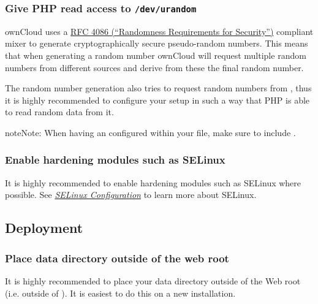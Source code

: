 \documentclass[letterpaper,10pt,english]{sphinxmanual}
\begin{document}
\subsubsection{Give PHP read access to \texttt{/dev/urandom}}
\label{configuration_server/harden_server:dev-urandom-label}\label{configuration_server/harden_server:give-php-read-access-to-dev-urandom}
ownCloud uses a \href{https://tools.ietf.org/html/rfc4086\#section-5.2}{RFC 4086 (``Randomness Requirements for Security'')} compliant
mixer to generate cryptographically secure pseudo-random numbers. This means
that when generating a random number ownCloud will request multiple random
numbers from different sources and derive from these the final random number.

The random number generation also tries to request random numbers from
, thus it is highly recommended to configure your setup in such
a way that PHP is able to read random data from it.

\begin{notice}{note}{Note:}
When having an  configured within your  file,
make sure to include .
\end{notice}


\subsubsection{Enable hardening modules such as SELinux}
\label{configuration_server/harden_server:enable-hardening-modules-such-as-selinux}
It is highly recommended to enable hardening modules such as SELinux where
possible. See {\hyperref[installation/selinux_configuration::doc]{\emph{\emph{SELinux Configuration}}}} to learn more about
SELinux.


\subsection{Deployment}
\label{configuration_server/harden_server:deployment}

\subsubsection{Place data directory outside of the web root}
\label{configuration_server/harden_server:place-data-directory-outside-of-the-web-root}
It is highly recommended to place your data directory outside of the Web root
(i.e. outside of ). It is easiest to do this on a new
installation.
\end{document}
